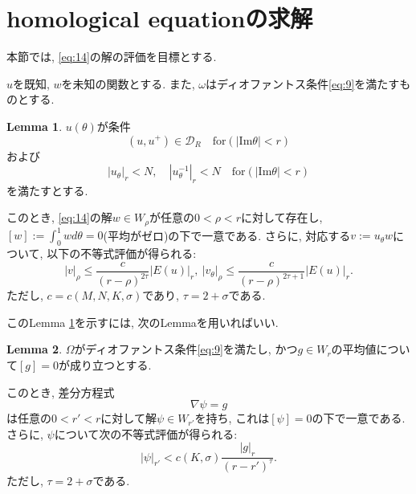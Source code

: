 \documentclass[a4paper]{ujarticle}
\numberwithin{equation}{section}
\theoremstyle{definition}
\newtheorem{lemma}{Lemma}
\begin{document}
    \section{homological equationの求解}
        本節では, \eqref{eq:14}の解の評価を目標とする.
        
        $u$を既知, $w$を未知の関数とする. また, $\omega$はディオファントス条件\eqref{eq:9}を満たすものとする.
        \begin{lemma} \label{lem:8}
            $u(\theta)$が条件
            \begin{equation} \label{eq:16}
                (u, u^{+}) \in \mathcal{D}_{R} \quad \text{for} (|\mathrm{Im} \theta| < r)
            \end{equation}
            および
            \begin{equation} \label{eq:17}
                |u_{\theta}|_r < N, \quad |u^{-1}_{\theta}|_r < N \quad \text{for} (|\mathrm{Im} \theta| < r)
            \end{equation}
            を満たすとする. 
            
            このとき, \eqref{eq:14}の解$w \in W_{\rho}$が任意の$0 < \rho < r$に対して存在し, $\displaystyle [w] := \int^{1}_{0} w d \theta = 0$(平均がゼロ)の下で一意である.
            さらに, 対応する$v := u_{\theta} w$について, 以下の不等式評価が得られる:
            \begin{equation} \label{eq:18}
                |v|_{\rho} \leq \frac{c}{(r - \rho)^{2 \tau}} |E(u)|_{r}, \ |v_{\theta}|_{\rho} \leq \frac{c}{(r - \rho)^{2 \tau + 1}} |E(u)|_{r}.
            \end{equation}
            ただし, $c = c(M ,N, K, \sigma)$であり, $\tau = 2 + \sigma$である.
        \end{lemma}

        このLemma \ref{lem:8}を示すには, 次のLemmaを用いればいい.
        \begin{lemma} \label{lem:9}
            $\Omega$がディオファントス条件\eqref{eq:9}を満たし, かつ$g \in W_r$の平均値について$[g] = 0$が成り立つとする.

            このとき, 差分方程式
            \begin{equation} \label{eq:19}
                \nabla \psi = g
            \end{equation}
            は任意の$0 < r' < r$に対して解$\psi \in W_{r'}$を持ち, これは$[\psi] = 0$の下で一意である.
            さらに, $\psi$について次の不等式評価が得られる:
            \begin{equation} \label{eq:20}
                |\psi|_{r'} < c(K, \sigma) \frac{|g|_{r}}{(r - r')^{\tau}}.
            \end{equation}
            ただし, $\tau = 2 + \sigma$である.
        \end{lemma}
\end{document}
